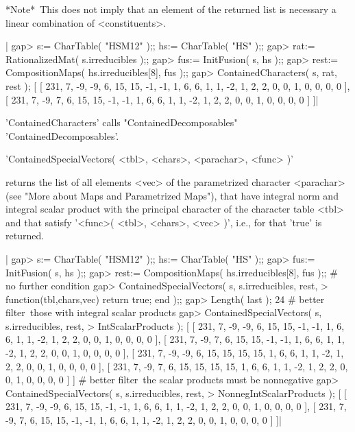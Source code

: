 *Note*\:\ This does not  imply  that an element  of the  returned list is
necessary a linear combination of <constituents>.

|    gap> s:= CharTable( "HSM12" );; hs:= CharTable( "HS" );;
    gap> rat:= RationalizedMat( s.irreducibles );;
    gap> fus:= InitFusion( s, hs );;
    gap> rest:= CompositionMaps( hs.irreducibles[8], fus );;
    gap> ContainedCharacters( s, rat, rest );
    [ [ 231, 7, -9, -9, 6, 15, 15, -1, -1, 1, 6, 6, 1, 1, -2, 1, 2, 2, 0,
          0, 1, 0, 0, 0, 0 ],
      [ 231, 7, -9, 7, 6, 15, 15, -1, -1, 1, 6, 6, 1, 1, -2, 1, 2, 2, 0,
          0, 1, 0, 0, 0, 0 ] ]|

'ContainedCharacters' calls "ContainedDecomposables"
'ContainedDecomposables'.


'ContainedSpecialVectors( <tbl>, <chars>, <parachar>, <func> )'

returns  the list  of all  elements <vec>  of the  parametrized character
<parachar> (see "More   about  Maps and Parametrized  Maps"),   that have
integral norm and integral scalar product with the principal character of
the character table <tbl> and that satisfy '<func>( <tbl>, <chars>, <vec>
)', i.e., for that 'true' is returned.

|    gap> s:= CharTable( "HSM12" );; hs:= CharTable( "HS" );;
    gap> fus:= InitFusion( s, hs );;
    gap> rest:= CompositionMaps( hs.irreducibles[8], fus );;
    # no further condition\:
    gap> ContainedSpecialVectors( s, s.irreducibles, rest,
    >                      function(tbl,chars,vec) return true; end );;
    gap> Length( last );
    24
    # better filter\:\ those with integral scalar products
    gap> ContainedSpecialVectors( s, s.irreducibles, rest,
    >                             IntScalarProducts );
    [ [ 231, 7, -9, -9, 6, 15, 15, -1, -1, 1, 6, 6, 1, 1, -2, 1, 2, 2, 0,
          0, 1, 0, 0, 0, 0 ],
      [ 231, 7, -9, 7, 6, 15, 15, -1, -1, 1, 6, 6, 1, 1, -2, 1, 2, 2, 0,
          0, 1, 0, 0, 0, 0 ],
      [ 231, 7, -9, -9, 6, 15, 15, 15, 15, 1, 6, 6, 1, 1, -2, 1, 2, 2, 0,
          0, 1, 0, 0, 0, 0 ],
      [ 231, 7, -9, 7, 6, 15, 15, 15, 15, 1, 6, 6, 1, 1, -2, 1, 2, 2, 0,
          0, 1, 0, 0, 0, 0 ] ]
    # better filter\:\ the scalar products must be nonnegative
    gap> ContainedSpecialVectors( s, s.irreducibles, rest,
    >                             NonnegIntScalarProducts );
    [ [ 231, 7, -9, -9, 6, 15, 15, -1, -1, 1, 6, 6, 1, 1, -2, 1, 2, 2, 0,
          0, 1, 0, 0, 0, 0 ],
      [ 231, 7, -9, 7, 6, 15, 15, -1, -1, 1, 6, 6, 1, 1, -2, 1, 2, 2, 0,
          0, 1, 0, 0, 0, 0 ] ]|

